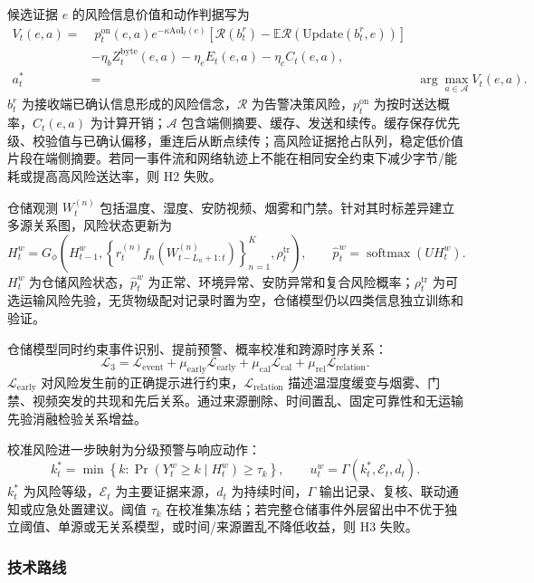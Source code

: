 候选证据 $e$ 的风险信息价值和动作判据写为
\[
\begin{aligned}
V_t(e,a)=&\;p_t^{\mathrm{on}}(e,a)e^{-\kappa\mathrm{AoI}_t(e)}
\left[\mathcal R(b_t^r)-\mathbb E\mathcal R\!\left(\mathrm{Update}(b_t^r,e)\right)\right]\\
&-\eta_b Z_t^{\mathrm{byte}}(e,a)-\eta_e E_t(e,a)-\eta_c C_t(e,a),\\
a_t^*&=&\arg\max_{a\in\mathcal A}V_t(e,a).
\end{aligned}
\tag{5}
\]
$b_t^r$ 为接收端已确认信息形成的风险信念，$\mathcal R$ 为告警决策风险，$p_t^{\mathrm{on}}$ 为按时送达概率，$C_t(e,a)$ 为计算开销；$\mathcal A$ 包含端侧摘要、缓存、发送和续传。缓存保存优先级、校验值与已确认偏移，重连后从断点续传；高风险证据抢占队列，稳定低价值片段在端侧摘要。若同一事件流和网络轨迹上不能在相同安全约束下减少字节/能耗或提高高风险送达率，则 H2 失败。

仓储观测 $W_t^{(n)}$ 包括温度、湿度、安防视频、烟雾和门禁。针对其时标差异建立多源关系图，风险状态更新为
\[
H_t^{w}=G_\phi\!\left(H_{t-1}^{w},
\left\{r_t^{(n)}f_n(W_{t-L_n+1:t}^{(n)})\right\}_{n=1}^{K},
\rho_t^{\mathrm{tr}}\right),\qquad
\hat p_t^{w}=\operatorname{softmax}(U H_t^{w}).
\tag{6}
\]
$H_t^{w}$ 为仓储风险状态，$\hat p_t^{w}$ 为正常、环境异常、安防异常和复合风险概率；$\rho_t^{\mathrm{tr}}$ 为可选运输风险先验，无货物级配对记录时置为空，仓储模型仍以四类信息独立训练和验证。

仓储模型同时约束事件识别、提前预警、概率校准和跨源时序关系：
\[
\mathcal L_{3}=\mathcal L_{\mathrm{event}}
+\mu_{\mathrm{early}}\mathcal L_{\mathrm{early}}
+\mu_{\mathrm{cal}}\mathcal L_{\mathrm{cal}}
+\mu_{\mathrm{rel}}\mathcal L_{\mathrm{relation}}.
\tag{7}
\]
$\mathcal L_{\mathrm{early}}$ 对风险发生前的正确提示进行约束，$\mathcal L_{\mathrm{relation}}$ 描述温湿度缓变与烟雾、门禁、视频突发的共现和先后关系。通过来源删除、时间置乱、固定可靠性和无运输先验消融检验关系增益。

校准风险进一步映射为分级预警与响应动作：
\[
k_t^*=\min\left\{k:\Pr(Y_t^{w}\ge k\mid H_t^{w})\ge\tau_k\right\},\qquad
u_t^w=\Gamma(k_t^*,\mathcal E_t,d_t).
\tag{8}
\]
$k_t^*$ 为风险等级，$\mathcal E_t$ 为主要证据来源，$d_t$ 为持续时间，$\Gamma$ 输出记录、复核、联动通知或应急处置建议。阈值 $\tau_k$ 在校准集冻结；若完整仓储事件外层留出中不优于独立阈值、单源或无关系模型，或时间/来源置乱不降低收益，则 H3 失败。

\subsubsection{技术路线}

